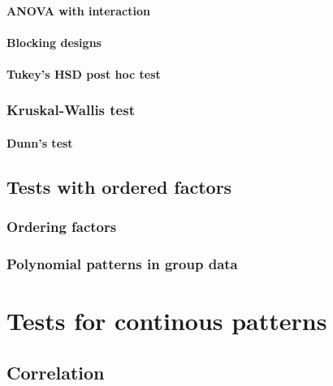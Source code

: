 \documentclass[
  13,
  letterpaper,
]{report}
\begin{document}
\subsubsection{ANOVA with
interaction}\label{sec-groups-more-anova-inter}

\subsubsection{Blocking designs}\label{sec-groups-more-anova-block}

\subsubsection{Tukey's HSD post hoc
test}\label{sec-groups-more-anova-tukey}

\subsection{Kruskal-Wallis test}\label{sec-groups-more-kw}

\subsubsection{Dunn's test}\label{sec-groups-more-kw-dunn}

\section{Tests with ordered factors}\label{sec-groups-ord}

\subsection{Ordering factors}\label{sec-groups-ord-fac}

\subsection{Polynomial patterns in group
data}\label{sec-groups-ord-poly}

\chapter{Tests for continous patterns}\label{sec-lin}

\section{Correlation}\label{sec-lin-cor}
\end{document}
